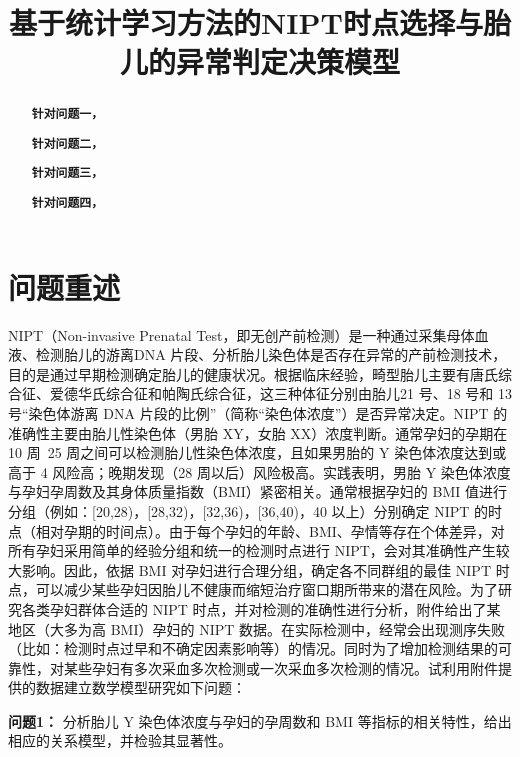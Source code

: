 \documentclass[withoutpreface,bwprint]{cumcmthesis} %
\title{基于统计学习方法的NIPT时点选择与胎儿的异常判定决策模型}
\begin{document}
\maketitle
\nocite{*}


\begin{abstract}

    \textbf{针对问题一，}

    \textbf{针对问题二，}

    \textbf{针对问题三，}

    \textbf{针对问题四，}

    \keywords{}
\end{abstract}

\section{问题重述}
NIPT（Non-invasive Prenatal Test，即无创产前检测）是一种通过采集母体血液、检测胎儿的游离DNA 片段、分析胎儿染色体是否存在异常的产前检测技术，目的是通过早期检测确定胎儿的健康状况。根据临床经验，畸型胎儿主要有唐氏综合征、爱德华氏综合征和帕陶氏综合征，这三种体征分别由胎儿21 号、18 号和 13 号“染色体游离 DNA 片段的比例”（简称“染色体浓度”）是否异常决定。NIPT 的准确性主要由胎儿性染色体（男胎 XY，女胎 XX）浓度判断。通常孕妇的孕期在 10 周~25 周之间可以检测胎儿性染色体浓度，且如果男胎的 Y 染色体浓度达到或高于 4%
风险高；晚期发现（28 周以后）风险极高。实践表明，男胎 Y 染色体浓度与孕妇孕周数及其身体质量指数（BMI）紧密相关。通常根据孕妇的
BMI 值进行分组（例如：[20,28)，[28,32)，[32,36)，[36,40)，40 以上）分别确定 NIPT 的时点（相对孕期的时间点）。由于每个孕妇的年龄、BMI、孕情等存在个体差异，对所有孕妇采用简单的经验分组和统一的检测时点进行 NIPT，会对其准确性产生较大影响。因此，依据 BMI 对孕妇进行合理分组，确定各不同群组的最佳 NIPT 时点，可以减少某些孕妇因胎儿不健康而缩短治疗窗口期所带来的潜在风险。为了研究各类孕妇群体合适的 NIPT 时点，并对检测的准确性进行分析，附件给出了某地区（大多为高 BMI）孕妇的 NIPT 数据。在实际检测中，经常会出现测序失败（比如：检测时点过早和不确定因素影响等）的情况。同时为了增加检测结果的可靠性，对某些孕妇有多次采血多次检测或一次采血多次检测的情况。试利用附件提供的数据建立数学模型研究如下问题：

\textbf{问题1：}
分析胎儿 Y 染色体浓度与孕妇的孕周数和 BMI 等指标的相关特性，给出相应的关系模型，并检验其显著性。
\end{document}
